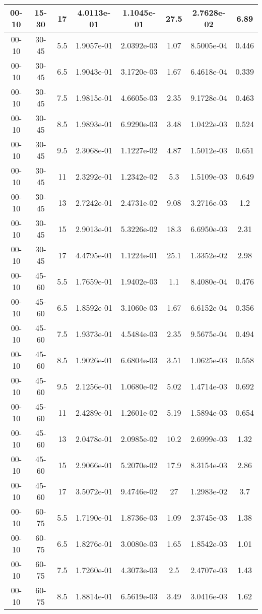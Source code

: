 \begin{longtable}{|cccccccc|}
00-10 & 15-30 & 17 & 4.0113e-01 & 1.1045e-01 & 27.5 & 2.7628e-02 & 6.89 \\ 
\hline
00-10 & 30-45 & 5.5 & 1.9057e-01 & 2.0392e-03 & 1.07 & 8.5005e-04 & 0.446 \\ 
00-10 & 30-45 & 6.5 & 1.9043e-01 & 3.1720e-03 & 1.67 & 6.4618e-04 & 0.339 \\ 
00-10 & 30-45 & 7.5 & 1.9815e-01 & 4.6605e-03 & 2.35 & 9.1728e-04 & 0.463 \\ 
00-10 & 30-45 & 8.5 & 1.9893e-01 & 6.9290e-03 & 3.48 & 1.0422e-03 & 0.524 \\ 
00-10 & 30-45 & 9.5 & 2.3068e-01 & 1.1227e-02 & 4.87 & 1.5012e-03 & 0.651 \\ 
00-10 & 30-45 & 11 & 2.3292e-01 & 1.2342e-02 & 5.3 & 1.5109e-03 & 0.649 \\ 
00-10 & 30-45 & 13 & 2.7242e-01 & 2.4731e-02 & 9.08 & 3.2716e-03 & 1.2 \\ 
00-10 & 30-45 & 15 & 2.9013e-01 & 5.3226e-02 & 18.3 & 6.6950e-03 & 2.31 \\ 
00-10 & 30-45 & 17 & 4.4795e-01 & 1.1224e-01 & 25.1 & 1.3352e-02 & 2.98 \\ 
\hline
00-10 & 45-60 & 5.5 & 1.7659e-01 & 1.9402e-03 & 1.1 & 8.4080e-04 & 0.476 \\ 
00-10 & 45-60 & 6.5 & 1.8592e-01 & 3.1060e-03 & 1.67 & 6.6152e-04 & 0.356 \\ 
00-10 & 45-60 & 7.5 & 1.9373e-01 & 4.5484e-03 & 2.35 & 9.5675e-04 & 0.494 \\ 
00-10 & 45-60 & 8.5 & 1.9026e-01 & 6.6804e-03 & 3.51 & 1.0625e-03 & 0.558 \\ 
00-10 & 45-60 & 9.5 & 2.1256e-01 & 1.0680e-02 & 5.02 & 1.4714e-03 & 0.692 \\ 
00-10 & 45-60 & 11 & 2.4289e-01 & 1.2601e-02 & 5.19 & 1.5894e-03 & 0.654 \\ 
00-10 & 45-60 & 13 & 2.0478e-01 & 2.0985e-02 & 10.2 & 2.6999e-03 & 1.32 \\ 
00-10 & 45-60 & 15 & 2.9066e-01 & 5.2070e-02 & 17.9 & 8.3154e-03 & 2.86 \\ 
00-10 & 45-60 & 17 & 3.5072e-01 & 9.4746e-02 & 27 & 1.2983e-02 & 3.7 \\ 
\hline
00-10 & 60-75 & 5.5 & 1.7190e-01 & 1.8736e-03 & 1.09 & 2.3745e-03 & 1.38 \\ 
00-10 & 60-75 & 6.5 & 1.8276e-01 & 3.0080e-03 & 1.65 & 1.8542e-03 & 1.01 \\ 
00-10 & 60-75 & 7.5 & 1.7260e-01 & 4.3073e-03 & 2.5 & 2.4707e-03 & 1.43 \\ 
00-10 & 60-75 & 8.5 & 1.8814e-01 & 6.5619e-03 & 3.49 & 3.0416e-03 & 1.62 \\ 

\end{longtable}
